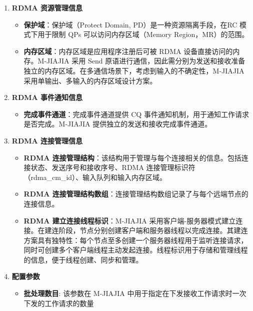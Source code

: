 {\begin{enumerate}[label=\arabic*., leftmargin=1em, align=left]
    \item \textbf{RDMA 资源管理信息}
        \begin{itemize}
            \item \textbf{保护域}：保护域（Protect Domain, PD）是一种资源隔离手段，在RC 模式下用于限制 QPs 可以访问内存区域（Memory Region，MR）的范围。
            \item \textbf{内存区域}：内存区域是应用程序注册后可被 RDMA 设备直接访问的内存。M-JIAJIA 采用 Send 原语进行通信，因此需分别为发送和接收准备独立的内存区域。在多通信场景下，考虑到输入的不确定性，M-JIAJIA 采用单输出、多输入的内存区域设计方案。
        \end{itemize}

    \item \textbf{RDMA 事件通知信息}
        \begin{itemize}
            \item \textbf{完成事件通道}：完成事件通道提供 CQ 事件通知机制，用于通知工作请求是否完成。M-JIAJIA 提供独立的发送和接收完成事件通道。
        \end{itemize}

    \item \textbf{RDMA 连接管理信息}
        \begin{itemize}
            \item \textbf{RDMA 连接管理结构}：该结构用于管理与每个连接相关的信息。包括连接状态、发送序号和接收序号、RDMA 连接管理标识符（rdma\_cm\_id）、输入队列和输入内存区域。
            \item \textbf{RDMA 连接管理结构数组}：连接管理结构数组记录了与每个远端节点的连接信息。
            \item \textbf{RDMA 建立连接线程标识}：M-JIAJIA 采用客户端-服务器模式建立连接。在建连阶段，节点分别创建客户端和服务器线程以完成连接。其建连方案具有独特性：每个节点至多创建一个服务器线程用于监听连接请求，同时可创建多个客户端线程主动发起连接。线程标识用于存储和管理线程的信息，便于线程创建、同步和管理。
        \end{itemize}
        
    \item \textbf{配置参数}
        \begin{itemize}[leftmargin=*, nosep]
            \item \textbf{批处理数目}: 该参数在 M-JIAJIA 中用于指定在下发接收工作请求时一次下发的工作请求的数量
        \end{itemize}
\end{enumerate}


}
